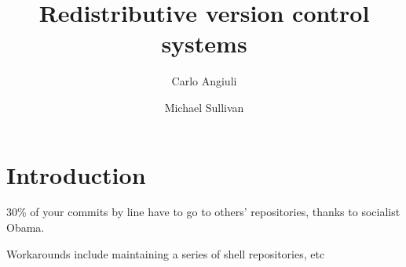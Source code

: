 \documentclass[10pt]{article}
\title{Redistributive version control systems}
\author{Carlo Angiuli \and Michael Sullivan}
\begin{document}
\maketitle

\section{Introduction}

30\% of your commits by line have to go to others' repositories, thanks to
socialist Obama.

Workarounds include maintaining a series of shell repositories, etc

%
\end{document}
